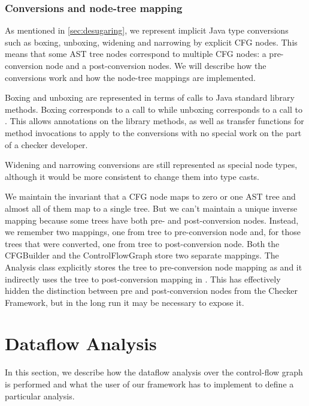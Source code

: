 \subsubsection{Conversions and node-tree mapping}
\label{sec:conversions}

As mentioned in \autoref{sec:desugaring}, we represent implicit Java type conversions such as boxing, unboxing, widening and narrowing by explicit CFG nodes.  This means that some 
AST tree nodes correspond to multiple CFG nodes: a pre-conversion node and a post-conversion
nodes.  We will describe how the conversions work and how the node-tree mappings are
implemented.

Boxing and unboxing are represented in terms of calls to Java standard library methods.  Boxing
corresponds to a call to  while unboxing corresponds to a call to
.  This allows annotations on the library methods, as well as transfer functions for method invocations to apply to the conversions with no special work on the part of
a checker developer.

Widening and narrowing conversions are still represented as special node types, although
it would be more consistent to change them into type casts.

We maintain the invariant that a CFG node maps to zero or one AST tree and almost all of them map to a single tree.  But we can't maintain a unique inverse mapping because some trees have both pre- and post-conversion nodes.  Instead, we remember two mappings, one from tree to pre-conversion node and, for those trees that were converted, one from tree to post-conversion node.  Both the CFGBuilder and the ControlFlowGraph store two separate mappings.  The Analysis class explicitly stores the tree to pre-conversion node mapping as  and it indirectly uses the tree to post-conversion mapping in .  This has effectively hidden the distinction between pre and post-conversion nodes from the Checker Framework, but in the long run
it may be necessary to expose it.



\section{Dataflow Analysis}

In this section, we describe how the dataflow analysis over the control-flow
graph is performed and what the user of our framework has to implement to
define a particular analysis.


